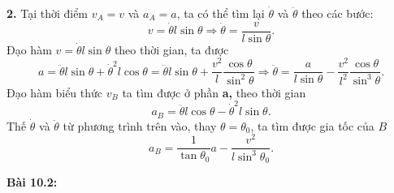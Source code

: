 \textbf{2.} Tại thời điểm \(v_A=v\) và \(a_A=a\), ta có thể tìm lại \(\dot{\theta}\) và \(\ddot{\theta}\) theo các bước:
\begin{equation} \label{eq1_rectangle_collision}
    v=\dot{\theta} l \sin \theta \Rightarrow \dot{\theta}= \dfrac{v}{l \sin \theta}.
\end{equation}
Đạo hàm $v=\dot{\theta} l \sin \theta$ theo thời gian, ta được
\begin{equation} \label{eq2_rectangle_collision}
    a = \ddot{\theta} l \sin \theta + \dot{\theta}^2 l \cos \theta = \ddot{\theta} l \sin \theta + \dfrac{v^2}{l} \dfrac{\cos \theta}{\sin^2 \theta} \Rightarrow \ddot{\theta}= \dfrac{a}{l \sin \theta} - \dfrac{v^2}{l^2} \dfrac{\cos \theta}{\sin^3 \theta}.
\end{equation}
Đạo hàm biểu thức $v_B$ ta tìm được ở phần \textbf{a,} theo thời gian
\begin{equation} \label{eq3_rectangle_collision}
    a_B = \ddot{\theta} l \cos \theta - \dot{\theta}^2 l \sin \theta.
\end{equation}
Thế $\dot{\theta}$ và $\ddot{\theta}$ từ phương trình trên vào, thay $\theta=\theta_0$, ta tìm được gia tốc của $B$
\begin{equation} \label{eq4_rectangle_collision}
    a_B = \dfrac{1}{\tan \theta_0} a - \dfrac{v^2}{l \sin^3 \theta_0}.
\end{equation}


\textbf{Bài 10.2:}

